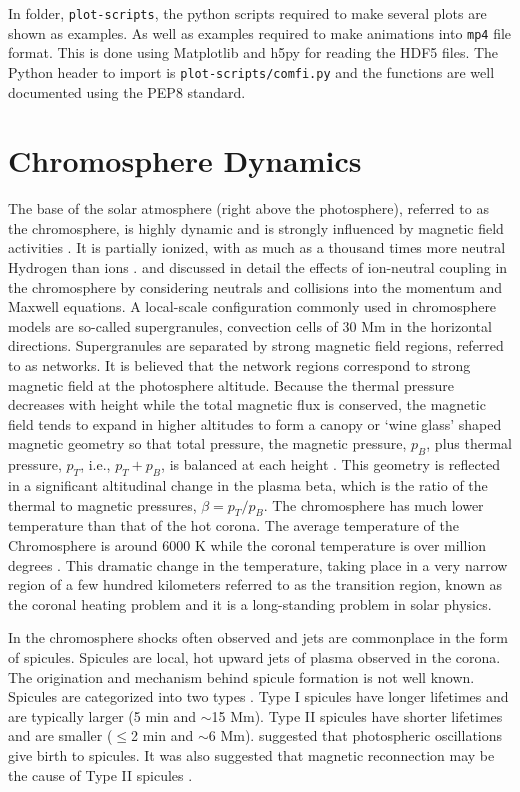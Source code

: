 \documentclass[12pt,upcase]{umlthesis}
\def\code#1{\texttt{#1}}
\begin{document}
In folder, \code{plot-scripts}, the python scripts required to make several plots are shown as examples. As well as examples required to make animations into \code{mp4} file format. This is done using Matplotlib and h5py for reading the HDF5 files. The Python header to import is \code{plot-scripts/comfi.py} and the functions are well documented using the PEP8 standard.

\chapter{Chromosphere Dynamics}\label{chap:chromosphere} 

The base of the solar atmosphere (right above the photosphere), referred to as the chromosphere, is highly dynamic and is strongly influenced by magnetic field activities \citep{Hasan08}. It is partially ionized, with as much as a thousand times more neutral Hydrogen than ions \citep{Alissandrakis2018}. \citet{Song2011} and \citet{Leake2014} discussed in detail the effects of ion-neutral coupling in  the chromosphere by considering neutrals and collisions into the momentum and Maxwell equations. A local-scale configuration commonly used in chromosphere models are so-called supergranules, convection cells of 30 Mm in the horizontal directions. Supergranules are separated by strong magnetic field regions, referred to as networks. It is believed that the network regions correspond to strong magnetic field at the photosphere altitude. Because the thermal pressure decreases with height while the total magnetic flux is conserved, the magnetic field tends to expand in higher altitudes to form a canopy or `wine glass' shaped magnetic geometry so that total pressure, the  magnetic pressure, $p_B$, plus thermal pressure, $p_T$, i.e., $p_T+p_B$, is balanced at each height \citep{gabriel1976}. This geometry is reflected in a significant altitudinal change in the plasma beta, which is the ratio of the thermal to magnetic pressures, $\beta=p_T/p_B$. The chromosphere has much lower temperature than that of the hot corona. The average temperature of the Chromosphere is around 6000 K while the coronal temperature is over million degrees \citep{AvrettLoeser2008}. This dramatic change in the temperature, taking place in a very narrow region of a few hundred kilometers referred to as the transition region, known as the coronal heating problem and it is a long-standing problem in solar physics.

In the chromosphere shocks often observed and jets are commonplace in the form of spicules. Spicules are local, hot upward jets of plasma observed in the corona. The origination and mechanism behind spicule formation is not well known. Spicules are categorized into two types \citep{Pontieu2007}. Type I spicules have longer lifetimes and are typically larger (5 min and $\sim$15 Mm). Type II spicules have shorter lifetimes and are smaller ($\leq$2 min and $\sim$6 Mm). \citet{Pontieu2004} suggested that photospheric oscillations give birth to spicules. It was also suggested that magnetic reconnection may be the cause of Type II spicules \citep{Pontieu2007}.
\end{document}
